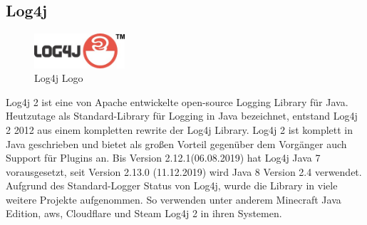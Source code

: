 
\subsection{Log4j}\label{subsec:log4j}
\begin{figure}
    \begin{center}
        \includegraphics[width=0.3\textwidth]{images/log4j}
    \end{center}
    \caption{Log4j Logo}
\end{figure}
Log4j 2 ist eine von Apache entwickelte open-source Logging Library für Java.
Heutzutage als Standard-Library für Logging in Java bezeichnet, entstand Log4j 2 2012 aus einem kompletten rewrite der Log4j Library.
Log4j 2 ist komplett in Java geschrieben und bietet als großen Vorteil gegenüber dem Vorgänger auch Support für Plugins an.
Bis Version 2.12.1(06.08.2019) hat Log4j Java 7 vorausgesetzt, seit Version 2.13.0 (11.12.2019) wird Java 8 Version 2.4 verwendet.
Aufgrund des Standard-Logger Status von Log4j, wurde die Library in viele weitere Projekte aufgenommen.
So verwenden unter anderem Minecraft Java Edition, \gls{aws}, Cloudflare und Steam Log4j 2 in ihren Systemen.
